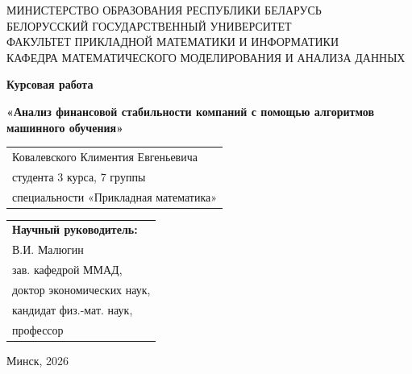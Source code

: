 \documentclass[14pt,a4paper]{extarticle}
\begin{document}
\begin{titlepage}
    \centering
    \vspace*{1cm}
    
    {\small МИНИСТЕРСТВО ОБРАЗОВАНИЯ РЕСПУБЛИКИ БЕЛАРУСЬ\\[2pt]
    БЕЛОРУССКИЙ ГОСУДАРСТВЕННЫЙ УНИВЕРСИТЕТ\\[2pt]
    ФАКУЛЬТЕТ ПРИКЛАДНОЙ МАТЕМАТИКИ И ИНФОРМАТИКИ\\[2pt]
    КАФЕДРА МАТЕМАТИЧЕСКОГО МОДЕЛИРОВАНИЯ И АНАЛИЗА ДАННЫХ}
    
    \vspace{3cm}
    
    {\large\bfseries Курсовая работа}
    
    \vspace{1.5cm}
    
    {\Large\bfseries «Анализ финансовой стабильности компаний с помощью алгоритмов машинного обучения»}
    
    \vspace{2cm}
    
    \begin{flushright}
        \begin{tabular}{@{}l@{}}
            Ковалевского Климентия Евгеньевича \\
            студента 3 курса, 7 группы \\
            специальности «Прикладная математика»
        \end{tabular}
    \end{flushright}
    
    \vspace{2cm}
    
    \begin{flushright}
        \begin{tabular}{@{}l@{}}
            \textbf{Научный руководитель:} \\
            В.И. Малюгин \\
            зав. кафедрой ММАД, \\
            доктор экономических наук, \\
            кандидат физ.-мат. наук, \\
            профессор
        \end{tabular}
    \end{flushright}
    
    \vfill
    
    {\large Минск, 2026}
\end{titlepage}
\end{document}
